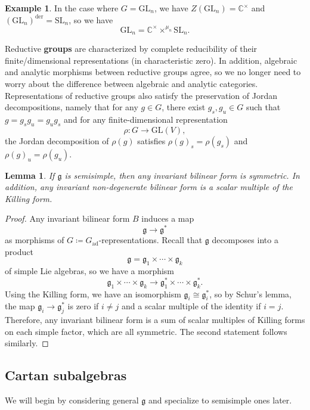 \documentclass{amsart}
\newtheorem{lem}[thm]{Lemma}
\theoremstyle{definition}
\newtheorem{exm}[thm]{Example}
\theoremstyle{remark}
\theoremstyle{plain}
\theoremstyle{definition}
\theoremstyle{remark}
\newcommand{\C}{\mathbb{C}}
\newcommand{\g}{\mathfrak{g}}
\newcommand{\mr}[1]{\mathrm{#1}}
\newcommand{\on}[1]{\operatorname{#1}}
\newcommand{\1}{\mathbf{1}}
\newcommand{\2}{\mathbf{2}}
\newcommand{\3}{\mathbf{3}}
\newcommand{\GL}{\mr{GL}}
\newcommand{\SL}{\mr{SL}}
\DeclareMathOperator{\ad}{ad}
\begin{document}
\begin{exm}
    In the case where \(G = \GL_n\), we have \(Z(\GL_n) = \C^{\times}\) and \({(\GL_n)}^{\on{der}} = \SL_n\), so we have
    \[ \GL_n = \C^{\times} \times^{\mu_n} \SL_n. \]
\end{exm}

Reductive \textbf{groups} are characterized by complete reducibility of their finite\-/dimensional representations (in characteristic zero). In addition, algebraic and analytic morphisms between reductive groups agree, so we no longer need to worry about the difference between algebraic and analytic categories. Representations of reductive groups also satisfy the preservation of Jordan decompositions, namely that for any \(g \in G\), there exist \(g_s, g_u \in G\) such that \(g = g_s g_u = g_u g_s\) and for any finite-dimensional representation
\[ \rho \colon G \to \GL(V), \]
the Jordan decomposition of \(\rho(g)\) satisfies \({\rho(g)}_s = \rho(g_s)\) and \({\rho(g)}_u = \rho(g_u)\).

\begin{lem}
    If \(\g\) is semisimple, then any invariant bilinear form is symmetric. In addition, any invariant non-degenerate bilinear form is a scalar multiple of the Killing form.
\end{lem}

\begin{proof}
    Any invariant bilinear form \(B\) induces a map
    \[ \g \to \g^* \]
    as morphisms of \(G \coloneqq G_{\ad}\)-representations. Recall that \(\g\) decomposes into a product 
    \[ \g = \g_1 \times \cdots \times \g_k \]
    of simple Lie algebras, so we have a morphism
    \[ \g_1 \times \cdots \times \g_k \to \g_1^* \times \cdots \times \g_k^*. \]
    Using the Killing form, we have an isomorphism \(\g_i \cong \g_i^*\), so by Schur's lemma, the map \(\g_i \to \g_j^*\) is zero if \(i \neq j\) and a scalar multiple of the identity if \(i = j\). Therefore, any invariant bilinear form is a sum of scalar multiples of Killing forms on each simple factor, which are all symmetric. The second statement follows similarly.
\end{proof}

\subsection{Cartan subalgebras}%
\label{sub:Cartan subalgebras}

We will begin by considering general \(\g\) and specialize to semisimple ones later. 
\end{document}
